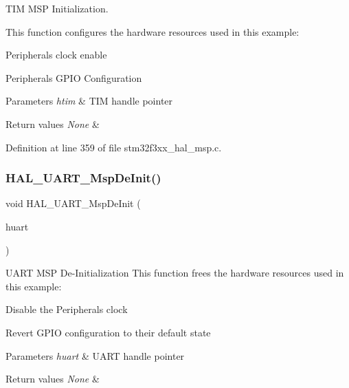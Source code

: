 T\+IM M\+SP Initialization. 

This function configures the hardware resources used in this example\+:


\begin{DoxyItemize}
\item Peripheral\textquotesingle{}s clock enable
\item Peripheral\textquotesingle{}s G\+P\+IO Configuration ~\newline
 
\begin{DoxyParams}{Parameters}
{\em htim} & T\+IM handle pointer\\
\hline
\end{DoxyParams}

\begin{DoxyRetVals}{Return values}
{\em None} & \\
\hline
\end{DoxyRetVals}

\end{DoxyItemize}

Definition at line 359 of file stm32f3xx\+\_\+hal\+\_\+msp.\+c.

\mbox{\label{group___h_a_l___m_s_p___private___functions_ga718f39804e3b910d738a0e1e46151188}} 
\subsubsection{H\+A\+L\+\_\+\+U\+A\+R\+T\+\_\+\+Msp\+De\+Init()}
{\footnotesize\ttfamily void H\+A\+L\+\_\+\+U\+A\+R\+T\+\_\+\+Msp\+De\+Init (\begin{DoxyParamCaption}\item[{U\+A\+R\+T\+\_\+\+Handle\+Type\+Def $\ast$}]{huart }\end{DoxyParamCaption})}



U\+A\+RT M\+SP De-\/\+Initialization This function frees the hardware resources used in this example\+: 


\begin{DoxyItemize}
\item Disable the Peripheral\textquotesingle{}s clock
\item Revert G\+P\+IO configuration to their default state 
\begin{DoxyParams}{Parameters}
{\em huart} & U\+A\+RT handle pointer \\
\hline
\end{DoxyParams}

\begin{DoxyRetVals}{Return values}
{\em None} & \\
\hline
\end{DoxyRetVals}

\end{DoxyItemize}

